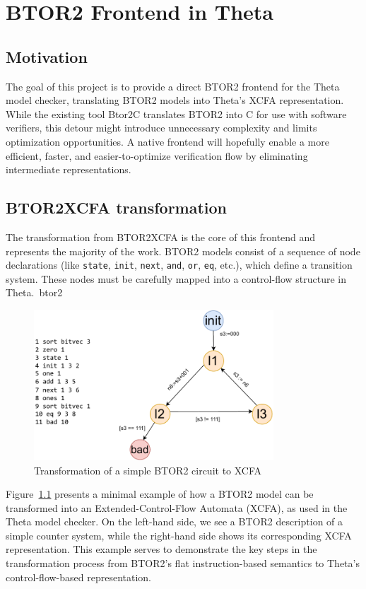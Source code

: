 \chapter{BTOR2 Frontend in Theta}

\section{Motivation}
The goal of this project is to provide a direct BTOR2 frontend for the Theta model checker, translating BTOR2 models into Theta's XCFA representation. While the existing tool Btor2C translates BTOR2 into C for use with software verifiers, this detour might introduce unnecessary complexity and limits optimization opportunities.\cite{btor2c} A native frontend will hopefully enable a more efficient, faster, and easier-to-optimize verification flow by eliminating intermediate representations.

\section{BTOR2XCFA transformation}
The transformation from BTOR2XCFA is the core of this frontend and represents the majority of the work. BTOR2 models consist of a sequence of node declarations (like \verb*|state|, \verb*|init|, \verb*|next|, \verb*|and|, \verb*|or|, \verb*|eq|, etc.), which define a transition system. These nodes must be carefully mapped into a control-flow structure in Theta.~\cite{theta}{btor2}

\begin{figure}
  \centering
  \includegraphics[width=0.8\textwidth]{figures/count2_cfa_code.pdf}
  \caption{ Transformation of a simple BTOR2 circuit to XCFA }
  \label{fig:count2_cfa_code}
\end{figure}

Figure~\ref{fig:count2_cfa_code} presents a minimal example of how a BTOR2 model can be transformed into an Extended-Control-Flow Automata (XCFA), as used in the Theta model checker. On the left-hand side, we see a BTOR2 description of a simple counter system, while the right-hand side shows its corresponding XCFA representation. This example serves to demonstrate the key steps in the transformation process from BTOR2's flat instruction-based semantics to Theta's control-flow-based representation.

